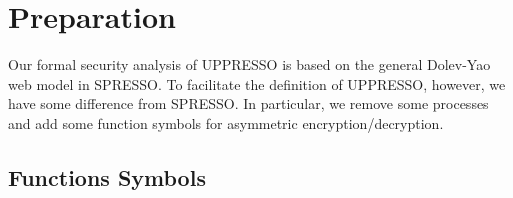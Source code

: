 \renewcommand{\algorithmicrequire}{\textbf{Input:}}
\newcommand{\deflet}{\textbf{let}}
\newcommand{\mystate}[1]{\STATE \textbf{let} {{}#1}}
\newcommand{\mystop}[1]{\STATE \textbf{stop} \myss{\myangle{{{}#1}}, s'}}
\newcommand{\mystopp}[1]{\STATE \textbf{stop} \myss{\myangle{{{}#1}}}}
\newcommand{\myss}[1]{${{}#1}$}
\newcommand{\myangle}[1]{\langle {{}#1} \rangle}
\newcommand{\myif}[1]{\IF{\myss{{{}#1}}}}
\newcommand{\myelse}[1]{\ELSIF{\myss{{{}#1}}}}

\newcommand{\aaa}[1]{\STATE \textbf{if} #1 \textbf{then} \begin{ALC@g}}
\newcommand{\bbb}[1]{\end{ALC@g} \STATE \textbf{else if} #1 \textbf{then} \begin{ALC@g}}
\newcommand{\ccc}{\end{ALC@g} \STATE \textbf{else} \textbf{then} \begin{ALC@g}}
\newcommand{\ddd}{\end{ALC@g} \STATE \textbf{endif}}

\newcommand{\SWITCH}[1]{\STATE \textbf{switch} #1\ \textbf{do} \begin{ALC@g}}
\newcommand{\ENDSWITCH}{\end{ALC@g}\STATE \textbf{end switch}}
\newcommand{\CASE}[1]{\STATE \textbf{case} #1\textbf{:} \begin{ALC@g}}
\newcommand{\ENDCASE}{\end{ALC@g}}
\newcommand{\CASELINE}[1]{\STATE \textbf{case} #1\textbf{:} }
\newcommand{\DEFAULT}{\STATE \textbf{default:} \begin{ALC@g}}
\newcommand{\ENDDEFAULT}{\end{ALC@g}}
\newcommand{\DEFAULTLINE}[1]{\STATE \textbf{default:} }

\setcounter{section}{0}
\renewcommand{\thesection}{\Alph{section}}

\section{Preparation}


Our formal security analysis of UPPRESSO is based on 
the general Dolev-Yao web model in SPRESSO. 
To facilitate the definition of UPPRESSO, however, 
we have some difference from SPRESSO. 
In particular, we remove some processes and 
add some function symbols for asymmetric encryption/decryption.

\subsection{Functions Symbols}


